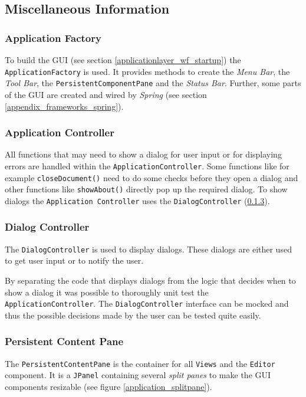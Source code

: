 \subsection{Miscellaneous Information}
\subsubsection{Application Factory}
\label{applicationlayer_applicationfactory}

To build the GUI (see section \ref{applicationlayer_wf_startup}) the \texttt{Application\-Factory} is used. It provides methods to create the \emph{Menu Bar}, the \emph{Tool Bar}, the \texttt{Persistent\-Component\-Pane} and the \emph{Status Bar}. Further, some parts of the GUI are created and wired by \emph{Spring} (see section \ref{appendix_frameworks_spring}). 

\subsubsection{Application Controller}
All functions that may need to show a dialog for user input or for displaying errors are handled within the \texttt{Application\-Controller}. Some functions like for example \texttt{closeDocument()} need to do some checks before they open a dialog and other functions like \texttt{showAbout()} directly pop up the required dialog. To show dialogs the \texttt{Application Controller} uses the \texttt{Dialog\-Controller} (\ref{applicationlayer_dialogcontroller}).

\subsubsection{Dialog Controller}
\label{applicationlayer_dialogcontroller}
The \texttt{Dialog\-Controller} is used to display dialogs. These dialogs are either used to get user input or to notify the user. 

By separating the code that displays dialogs from the logic that decides when
to show a dialog it was possible to thoroughly unit test the \texttt{Application\-Controller}. The \texttt{Dialog\-Controller} interface can be mocked and thus the possible decisions made by the user can be tested quite easily.



\subsubsection{Persistent Content Pane}
The \texttt{Persistent\-Content\-Pane} is the container for all \texttt{Views} and the \texttt{Editor} component. It is a \texttt{JPanel} containing several \emph{split panes} to make the GUI components resizable (see figure \ref{application_splitpane}).

